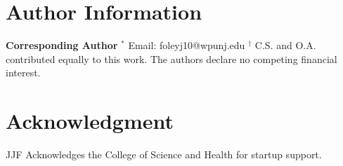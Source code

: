 \documentclass[journal=jpclcd,manuscript=article]{achemso}
\begin{document}
\section{Author Information}
{\bf Corresponding Author}
$^*$ Email: foleyj10@wpunj.edu
\newline
$^{\dagger}$  C.S. and O.A. contributed equally to this work.
\newline
The authors declare no competing financial interest.

\section{Acknowledgment}
JJF Acknowledges the College of Science and Health for startup support.


 
\end{document}

